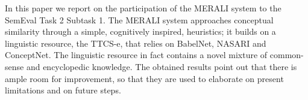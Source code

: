 In this paper we report on the participation of the MERALI system to the SemEval Task 2 Subtask 1. The MERALI system approaches conceptual similarity through a simple, cognitively inspired, heuristics; it builds on a linguistic resource, the TTCS-e, that relies on BabelNet, NASARI and ConceptNet. The linguistic resource in fact contains a novel mixture of common-sense and encyclopedic knowledge. The obtained results point out that there is ample room for improvement, so that they are used to elaborate on present limitations and on future steps.
